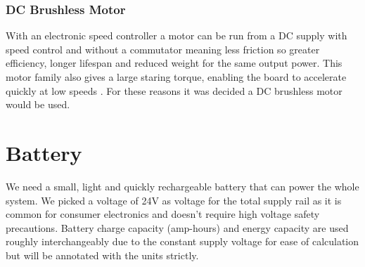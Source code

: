\documentclass[journal,10pt]{IEEEtran}
\begin{document}
        \subsubsection{DC Brushless Motor}
            With an electronic speed controller a motor can be run from a DC supply with speed control and without a commutator meaning less friction so greater efficiency, longer lifespan and reduced weight for the same output power. This motor family also gives a large staring torque, enabling the board to accelerate quickly at low speeds \cite{AC_Motor}. For these reasons it was decided a DC brushless motor would be used.
    \section{Battery}
    We need a small, light and quickly rechargeable battery that can power the whole system. We picked a voltage of 24V as voltage for the total supply rail as it is common for consumer electronics and doesn't require high voltage safety precautions. Battery charge capacity (amp-hours) and energy capacity are used roughly interchangeably due to the constant supply voltage for ease of calculation but will be annotated with the units strictly.
\end{document}
